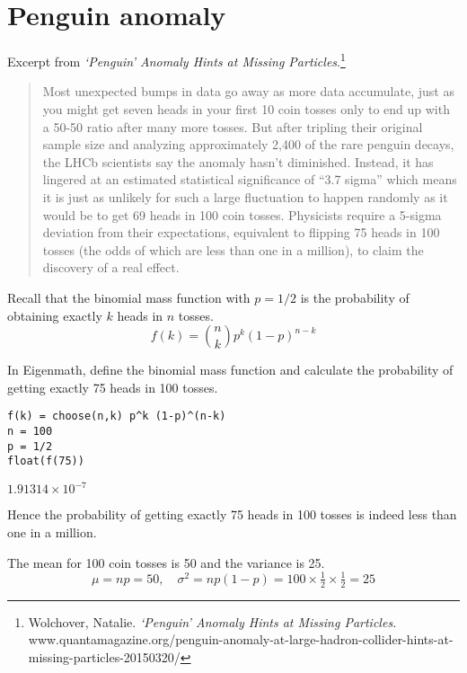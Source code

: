 

\section*{Penguin anomaly}

Excerpt from {\it `Penguin' Anomaly Hints at Missing Particles}.\footnote{
Wolchover, Natalie.
{\it `Penguin' Anomaly Hints at Missing Particles.}\\
www.quantamagazine.org/penguin-anomaly-at-large-hadron-collider-hints-at-missing-particles-20150320/}

\begin{quote}
Most unexpected bumps in data go away as more data accumulate, just as you might get seven heads in your first 10 coin tosses only to end up with a 50-50 ratio after many more tosses. But after tripling their original sample size and analyzing approximately 2,400 of the rare penguin decays, the LHCb scientists say the anomaly hasn't diminished. Instead, it has lingered at an estimated statistical significance of ``3.7 sigma'' which means it is just as unlikely for such a large fluctuation to happen randomly as it would be to get 69 heads in 100 coin tosses. Physicists require a 5-sigma deviation from their expectations, equivalent to flipping 75 heads in 100 tosses (the odds of which are less than one in a million), to claim the discovery of a real effect.
\end{quote}

Recall that the binomial mass function with $p=1/2$
is the probability of obtaining exactly
$k$ heads in $n$ tosses.
\begin{equation*}
f(k)={n\choose k}p^k(1-p)^{n-k}
\end{equation*}

In Eigenmath, define the binomial mass function
and calculate the probability
of getting exactly 75 heads in 100 tosses.

{\color{blue}
\begin{verbatim}
f(k) = choose(n,k) p^k (1-p)^(n-k)
n = 100
p = 1/2
float(f(75))
\end{verbatim}}

$1.91314\times10^{-7}$

\bigskip
Hence the probability of getting exactly 75 heads in 100 tosses is indeed
less than one in a million.

\bigskip
The mean for 100 coin tosses is 50 and the variance is 25.
\begin{equation*}
\mu=np=50,\quad\sigma^2=np(1-p)=100\times\tfrac{1}{2}\times\tfrac{1}{2}=25
\end{equation*}

